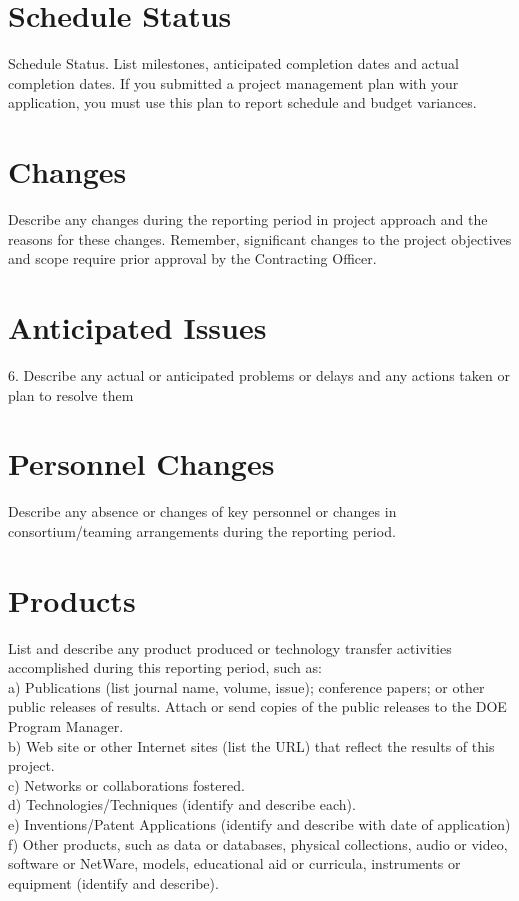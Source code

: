 \documentclass[12pt]{article}
\begin{document}
\section{Schedule Status}
\label{sect::schedule}
Schedule Status.  List milestones, anticipated completion dates and actual completion dates.  If you submitted a project management plan with your application, you must use this plan to report schedule and budget variances.   

\section{Changes}
\label{sect::changes}
Describe any changes during the reporting period in project approach and the reasons for these changes.  Remember, significant changes to the project objectives and scope require prior approval by the Contracting Officer. 

\section{Anticipated Issues}
\label{sect::schedule}
6.	Describe any actual or anticipated problems or delays and any actions taken or plan to resolve them 

\section{Personnel Changes}
\label{sect::personnel}
Describe any absence or changes of key personnel or changes in consortium/teaming arrangements during the reporting period. 

\section{Products}
\label{sect::products}
List and describe any product produced or technology transfer activities accomplished during this reporting period, such as: \\
a)	Publications (list journal name, volume, issue); conference papers; or other public releases of results.  Attach or send copies of the public releases to the DOE Program Manager. \\
b)	Web site or other Internet sites (list the URL) that reflect the results of this project. \\
c)	Networks or collaborations fostered. \\
d)	Technologies/Techniques (identify and describe each). \\
e)	Inventions/Patent Applications (identify and describe with date of application) \\
f)	Other products, such as data or databases, physical collections, audio or video, software or NetWare, models, educational aid or curricula, instruments or equipment (identify and describe).
\end{document}
